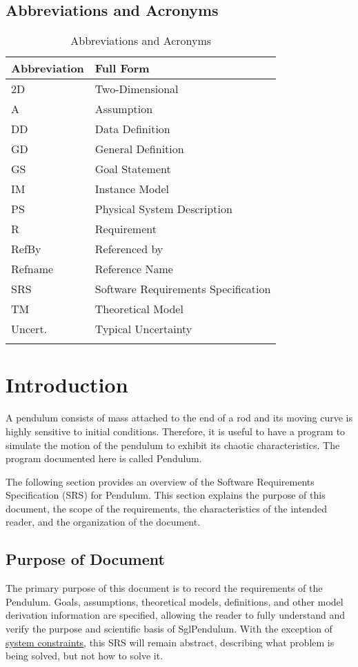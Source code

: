 \documentclass[12pt]{article}
\begin{document}
\subsection{Abbreviations and Acronyms}
\label{Sec:TAbbAcc}
\begin{longtable}{l l}
\toprule
\textbf{Abbreviation} & \textbf{Full Form}
\\
\midrule
\endhead
2D & Two-Dimensional
\\
A & Assumption
\\
DD & Data Definition
\\
GD & General Definition
\\
GS & Goal Statement
\\
IM & Instance Model
\\
PS & Physical System Description
\\
R & Requirement
\\
RefBy & Referenced by
\\
Refname & Reference Name
\\
SRS & Software Requirements Specification
\\
TM & Theoretical Model
\\
Uncert. & Typical Uncertainty
\\
\bottomrule
\caption{Abbreviations and Acronyms}
\label{Table:TAbbAcc}
\end{longtable}
\section{Introduction}
\label{Sec:Intro}
A pendulum consists of mass attached to the end of a rod and its moving curve is highly sensitive to initial conditions. Therefore, it is useful to have a program to simulate the motion of the pendulum to exhibit its chaotic characteristics. The program documented here is called Pendulum.

The following section provides an overview of the Software Requirements Specification (SRS) for Pendulum. This section explains the purpose of this document, the scope of the requirements, the characteristics of the intended reader, and the organization of the document.

\subsection{Purpose of Document}
\label{Sec:DocPurpose}
The primary purpose of this document is to record the requirements of the Pendulum. Goals, assumptions, theoretical models, definitions, and other model derivation information are specified, allowing the reader to fully understand and verify the purpose and scientific basis of SglPendulum. With the exception of \hyperref[Sec:SysConstraints]{system constraints}, this SRS will remain abstract, describing what problem is being solved, but not how to solve it.
\end{document}
